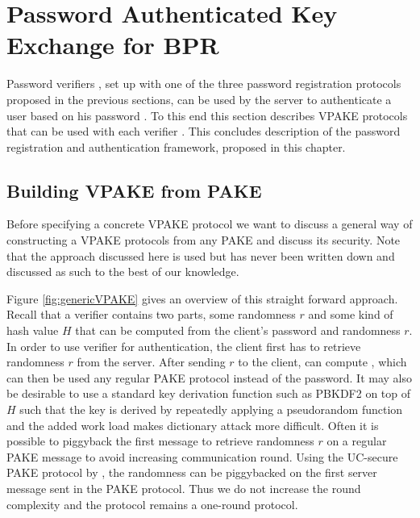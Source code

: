 \section{Password Authenticated Key Exchange for BPR}\label{sec:pake}

Password verifiers \ver, set up with one of the three password registration protocols proposed in the previous sections, can be used by the server to authenticate a user based on his password \pwd.
To this end this section describes \ac{VPAKE} protocols that can be used with each verifier \ver.
This concludes description of the password registration and authentication framework, proposed in this chapter.


\subsection{Building VPAKE from PAKE} \label{sec:vpakeToPake}
Before specifying a concrete \ac{VPAKE} protocol we want to discuss a general way of constructing a \ac{VPAKE} protocols from any \ac{PAKE} and discuss its security.
Note that the approach discussed here is used but has never been written down and discussed as such to the best of our knowledge.

Figure \ref{fig:genericVPAKE} gives an overview of this straight forward approach.
Recall that a verifier \ver contains two parts, some randomness $r$ and some kind of hash value $H$ that can be computed from the client's password \pwd and randomness $r$.
In order to use verifier \ver for authentication, the client first has to retrieve randomness $r$ from the server.
After sending $r$ to the client, \Client can compute \ver, which can then be used any regular \ac{PAKE} protocol instead of the password.
It may also be desirable to use a standard key derivation function such as PBKDF2 \cite{rfc2898} on top of $H$ such that the key is derived by repeatedly applying a pseudorandom function and the added work load makes dictionary attack more difficult.
Often it is possible to piggyback the first message to retrieve randomness $r$ on a regular \ac{PAKE} message to avoid increasing communication round. 
Using the UC-secure \ac{PAKE} protocol by \citet{Benhamouda2013}, the randomness can be piggybacked on the first server message sent in the \ac{PAKE} protocol. 
Thus we do not increase the round complexity and the protocol remains a one-round protocol.

